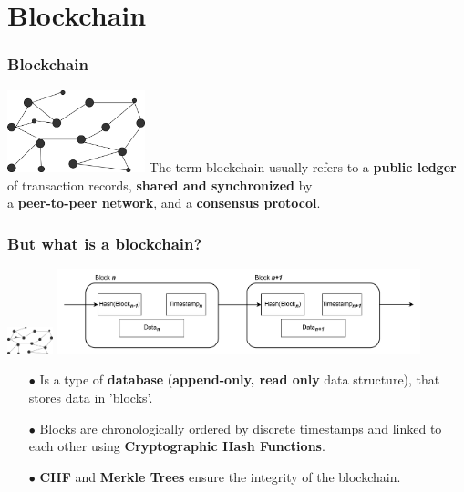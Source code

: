 \documentclass{beamer}
\begin{document}
\section{Blockchain}
\begin{frame}
\frametitle{Blockchain}
\includegraphics[width=0.3\textwidth,center]{bc}
\linebreak
\linebreak
The term blockchain usually refers to a \textbf{public ledger} of transaction records, \textbf{shared and synchronized} by \\a\textbf{ peer-to-peer network}, and a \textbf{consensus protocol}.
\end{frame}


\begin{frame}
\frametitle{But what is a blockchain?}
\includegraphics[width=0.1\textwidth,right]{bc}
\includegraphics[width=0.79\textwidth,center]{../images/bc}
\begin{itemize}
	\item[$\bullet$] Is a type of \textbf{database} (\textbf{append-only, read only} data structure), that stores
	data in 'blocks'.
	\item[$\bullet$] Blocks are chronologically ordered by discrete timestamps and
	linked to each other using \textbf{Cryptographic Hash Functions}.
	\item[$\bullet$] \textbf{CHF} and \textbf{Merkle Trees} ensure the integrity of the blockchain.
\end{itemize}
\end{frame}
\end{document}
